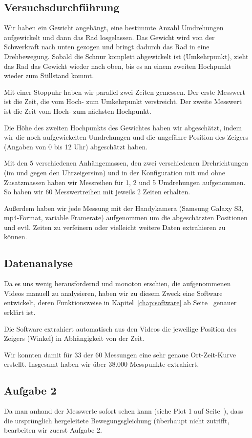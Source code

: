 \documentclass[a4paper,german,12pt,smallheadings]{scrartcl}
\begin{document}
\subsection{Versuchsdurchführung}

Wir haben ein Gewicht angehängt, eine bestimmte Anzahl Umdrehungen aufgewickelt
und dann das Rad losgelassen. Das Gewicht wird von der Schwerkraft nach unten
gezogen und bringt dadurch das Rad in eine Drehbewegung. Sobald die Schnur
komplett abgewickelt ist (Umkehrpunkt), zieht das Rad das Gewicht wieder nach
oben, bis es an einem zweiten Hochpunkt wieder zum Stillstand kommt.

Mit einer Stoppuhr haben wir parallel zwei Zeiten gemessen. Der erste Messwert
ist die Zeit, die vom Hoch- zum Umkehrpunkt verstreicht. Der zweite Messwert ist
die Zeit vom Hoch- zum nächsten Hochpunkt.

Die Höhe des zweiten Hochpunkts des Gewichtes haben wir abgeschätzt, indem wir
die noch aufgewickelten Umdrehungen und die ungefähre Position des Zeigers
(Angaben von 0 bis 12 Uhr) abgeschätzt haben.

Mit den 5 verschiedenen Anhängemassen, den zwei verschiedenen Drehrichtungen
(im und gegen den Uhrzeigersinn) und in der Konfiguration mit und ohne
Zusatzmassen haben wir Messreihen für 1, 2 und 5 Umdrehungen aufgenommen. So
haben wir 60 Messwertreihen mit jeweils 2 Zeiten erhalten.

Außerdem haben wir jede Messung mit der Handykamera (Samsung Galaxy S3,
mp4-Format, variable Framerate) aufgenommen um die abgeschätzten Positionen und
evtl. Zeiten zu verfeinern oder vielleicht weitere Daten extrahieren zu können.

\subsection{Datenanalyse}
Da es uns wenig herausfordernd und monoton erschien, die aufgenommenen Videos
manuell zu analysieren, haben wir zu diesem Zweck eine Software entwickelt,
deren Funktionsweise in Kapitel~\ref{chap:software} ab
Seite~\pageref{chap:software} genauer erklärt ist.

Die Software extrahiert automatisch aus den Videos die jeweilige Position des
Zeigers (Winkel) in Abhängigkeit von der Zeit.

Wir konnten damit für 33 der 60 Messungen eine sehr genaue Ort-Zeit-Kurve
erstellt. Insgesamt haben wir über 38.000 Messpunkte extrahiert.

\subsection{Aufgabe 2}
Da man anhand der Messwerte sofort sehen kann (siehe Plot 1 auf
Seite~\pageref{plot:57-lin}), dass die ursprünglich hergeleitete
Bewegungsgleichung (überhaupt nicht zutrifft, bearbeiten wir zuerst Aufgabe 2.
\end{document}
